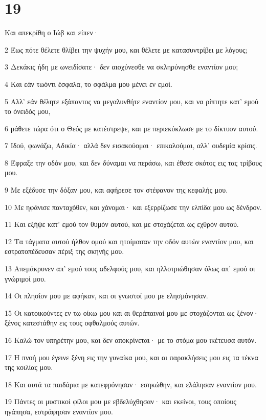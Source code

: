 \chapter{19}

\par Και απεκρίθη ο Ιώβ και είπεν·
\par 2 Έως πότε θέλετε θλίβει την ψυχήν μου, και θέλετε με κατασυντρίβει με λόγους;
\par 3 Δεκάκις ήδη με ωνειδίσατε· δεν αισχύνεσθε να σκληρύνησθε εναντίον μου;
\par 4 Και εάν τωόντι έσφαλα, το σφάλμα μου μένει εν εμοί.
\par 5 Αλλ' εάν θέλητε εξάπαντος να μεγαλυνθήτε εναντίον μου, και να ρίπτητε κατ' εμού το όνειδός μου,
\par 6 μάθετε τώρα ότι ο Θεός με κατέστρεψε, και με περιεκύκλωσε με το δίκτυον αυτού.
\par 7 Ιδού, φωνάζω, Αδικία· αλλά δεν εισακούομαι· επικαλούμαι, αλλ' ουδεμία κρίσις.
\par 8 Έφραξε την οδόν μου, και δεν δύναμαι να περάσω, και έθεσε σκότος εις τας τρίβους μου.
\par 9 Με εξέδυσε την δόξαν μου, και αφήρεσε τον στέφανον της κεφαλής μου.
\par 10 Με ηφάνισε πανταχόθεν, και χάνομαι· και εξερρίζωσε την ελπίδα μου ως δένδρον.
\par 11 Και εξήψε κατ' εμού τον θυμόν αυτού, και με στοχάζεται ως εχθρόν αυτού.
\par 12 Τα τάγματα αυτού ήλθον ομού και ητοίμασαν την οδόν αυτών εναντίον μου, και εστρατοπέδευσαν πέριξ της σκηνής μου.
\par 13 Απεμάκρυνεν απ' εμού τους αδελφούς μου, και ηλλοτριώθησαν όλως απ' εμού οι γνώριμοί μου.
\par 14 Οι πλησίον μου με αφήκαν, και οι γνωστοί μου με ελησμόνησαν.
\par 15 Οι κατοικούντες εν τω οίκω μου και αι θεράπαιναί μου με στοχάζονται ως ξένον· ξένος κατεστάθην εις τους οφθαλμούς αυτών.
\par 16 Καλώ τον υπηρέτην μου, και δεν αποκρίνεται· με το στόμα μου ικέτευσα αυτόν.
\par 17 Η πνοή μου έγεινε ξένη εις την γυναίκα μου, και αι παρακλήσεις μου εις τα τέκνα της κοιλίας μου.
\par 18 Και αυτά τα παιδάρια με κατεφρόνησαν· εσηκώθην, και ελάλησαν εναντίον μου.
\par 19 Πάντες οι μυστικοί φίλοι μου με εβδελύχθησαν· και εκείνοι, τους οποίους ηγάπησα, εστράφησαν εναντίον μου.
